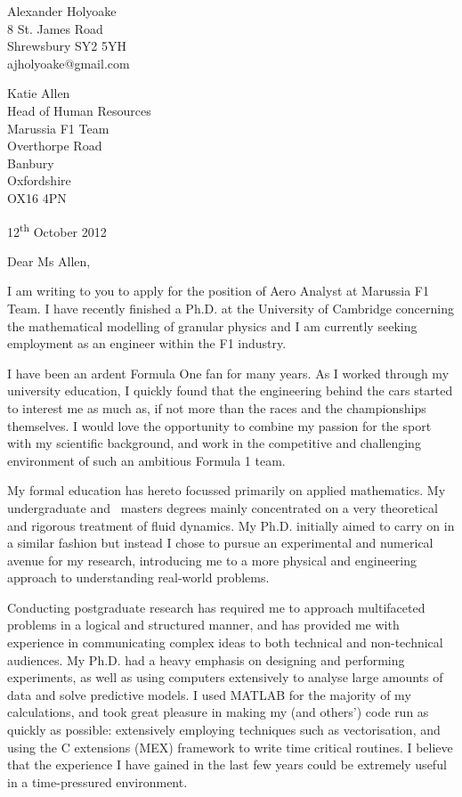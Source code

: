 \documentclass[a4paper,10pt]{article}
\begin{document}
\begin{flushright}
Alexander Holyoake \\ 8 St. James Road \\ Shrewsbury SY2 5YH \\ ajholyoake@gmail.com
\end{flushright}

\begin{flushleft} 
 Katie Allen \\ Head of Human Resources \\ Marussia F1 Team \\ Overthorpe Road \\ Banbury \\ Oxfordshire \\ OX16 4PN
\end{flushleft}

\begin{flushright}
12\textsuperscript{th} October 2012
\end{flushright}

\noindent Dear Ms Allen,

I am writing to you to apply for the position of Aero Analyst at Marussia F1 Team. I have recently finished a Ph.D. at the University of Cambridge concerning the mathematical modelling of granular physics and I am currently seeking employment as an engineer within the F1 industry. 

I have been an ardent Formula One fan for many years. As I worked through my university education, I quickly found that the engineering behind the cars started to interest me as much as, if not more than the races and the championships themselves. I would love the opportunity to combine my passion for the sport with my scientific background, and work in the competitive and challenging environment of such an ambitious Formula 1 team. 

My formal education has hereto focussed primarily on applied mathematics. My undergraduate and  masters degrees mainly concentrated on a very theoretical and rigorous treatment of fluid dynamics. My Ph.D. initially aimed to carry on in a similar fashion but instead I chose to pursue an experimental and numerical avenue for my research, introducing me to a more physical and engineering approach to understanding real-world problems.

Conducting postgraduate research has required me to approach multifaceted problems in a logical and structured manner, and has provided me with experience in communicating complex ideas to both technical and non-technical audiences. My Ph.D. had a heavy emphasis on designing and performing experiments, as well as using computers extensively to analyse large amounts of data and solve predictive models. I used MATLAB for the majority of my calculations, and took great pleasure in making my (and others') code run as quickly as possible: extensively employing techniques such as vectorisation, and using the C extensions (MEX) framework to write time critical routines. I believe that the experience I have gained in the last few years could be extremely useful in a time-pressured environment. 
\end{document}
